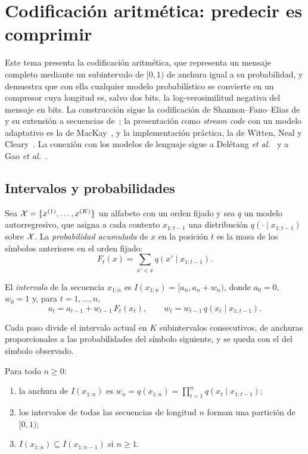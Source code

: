 \chapter{Codificación aritmética: predecir es comprimir}
\label{tema:4}

Este tema presenta la codificación aritmética, que representa un mensaje completo mediante un subintervalo de $[0,1)$ de anchura igual a su probabilidad, y demuestra que con ella cualquier modelo probabilístico se convierte en un compresor cuya longitud es, salvo dos bits, la log-verosimilitud negativa del mensaje en bits. La construcción sigue la codificación de Shannon--Fano--Elias de~\cite[§5.9]{ct} y su extensión a secuencias de~\cite[§13.3]{ct}; la presentación como \emph{stream code} con un modelo adaptativo es la de MacKay~\cite[cap.~6]{mackay}, y la implementación práctica, la de Witten, Neal y Cleary~\cite{wnc}. La conexión con los modelos de lenguaje sigue a Delétang \emph{et al.}~\cite{deletang} y a Gao \emph{et al.}~\cite{pile}.

\section{Intervalos y probabilidades}

Sea $\mathcal{X}=\{x^{(1)},\dots,x^{(K)}\}$ un alfabeto con un orden fijado y sea $q$ un modelo autorregresivo, que asigna a cada contexto $x_{1:t-1}$ una distribución $q(\cdot\mid x_{1:t-1})$ sobre $\mathcal{X}$. La \emph{probabilidad acumulada} de $x$ en la posición $t$ es la masa de los símbolos anteriores en el orden fijado:
\[
F_t(x)=\sum_{x'<x}q(x'\mid x_{1:t-1}).
\]

\begin{definicion}\label{def:intervalo}
El \emph{intervalo} de la secuencia $x_{1:n}$ es $I(x_{1:n})=[a_n,a_n+w_n)$, donde $a_0=0$, $w_0=1$ y, para $t=1,\dots,n$,
\[
a_t=a_{t-1}+w_{t-1}\,F_t(x_t),\qquad w_t=w_{t-1}\,q(x_t\mid x_{1:t-1}).
\]
\end{definicion}

Cada paso divide el intervalo actual en $K$ subintervalos consecutivos, de anchuras proporcionales a las probabilidades del símbolo siguiente, y se queda con el del símbolo observado.

\begin{proposicion}\label{prop:intervalos}
Para todo $n\ge 0$:
\begin{enumerate}
  \item la anchura de $I(x_{1:n})$ es $w_n=q(x_{1:n})=\prod_{t=1}^{n}q(x_t\mid x_{1:t-1})$;
  \item los intervalos de todas las secuencias de longitud $n$ forman una partición de $[0,1)$;
  \item $I(x_{1:n})\subseteq I(x_{1:n-1})$ si $n\ge 1$.
\end{enumerate}
\end{proposicion}

